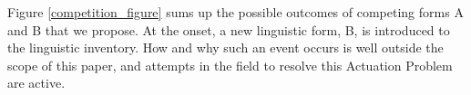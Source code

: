 




Figure \ref{competition_figure} sums up the possible outcomes of competing forms A and B that we propose. 
At the onset, a new linguistic form, B, is introduced to the linguistic inventory.
How and why such an event occurs is well outside the scope of this paper, and attempts in the field to resolve this Actuation Problem are active.







%
%







 